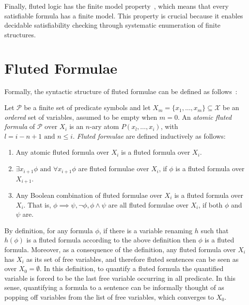 Finally, fluted logic has the finite model property~\cite{purdy1996decidability,purdy1996fluted,purdy1999quine}, which means that every satisfiable formula has a finite model.
This property is crucial because it enables decidable satisfiability checking through systematic enumeration of finite structures.

\section{Fluted Formulae}\label{sec:fluted-formulae}

Formally, the syntactic structure of fluted formulae can be defined as follows~\cite{schmidt2000resolution}:

\begin{definition}\label{def:fluted-formulae}
  Let \(\mathcal{P}\) be a finite set of predicate symbols and let \(X_m = \{x_1, \ldots, x_m\} \subseteq \mathcal{X}\) be an \emph{ordered} set of variables, assumed to be empty when \(m=0\).
  An \emph{atomic fluted formula} of \(\mathcal{P} \text{ over } X_i\) is an \(n\)-ary atom \(P(x_l,\ldots, x_i)\), with \(l = i - n + 1 \text{ and } n \leq i\).
  \emph{Fluted formulae} are defined inductively as follows:
  \begin{enumerate}
    \item Any atomic fluted formula over \(X_i\) is a fluted formula over \(X_i\).
    \item \(\exists x_{i+1}\phi \text{ and } \forall x_{i+1}\phi\) are fluted formulae over \(X_{i}\), if \(\phi\) is a fluted formula over \(X_{i+1}\).
    \item Any Boolean combination of fluted formulae over \(X_i\) is a fluted formula over \(X_i\). That is, \(\phi \implies \psi, \neg \phi, \phi \land \psi\) are all fluted formulae over \(X_i\), if both \(\phi\) and \(\psi\) are.
  \end{enumerate}
\end{definition}

By definition, for any formula \(\phi\), if there is a variable renaming \(h\) such that \(h(\phi)\) is a fluted formula according to the above definition then \(\phi\) is a fluted formula.
Moreover, as a consequence of the definition, any fluted formula over \(X_i\) has \(X_i\) as its set of free variables, and therefore fluted sentences can be seen as over \(X_0 = \emptyset\).
In this definition, to quantify a fluted formula the quantified variable is forced to be the last free variable occurring in all predicate. In this sense, quantifying a formula to a sentence can be informally thought of as popping off variables from the list of free variables, which converges to \(X_0\).

